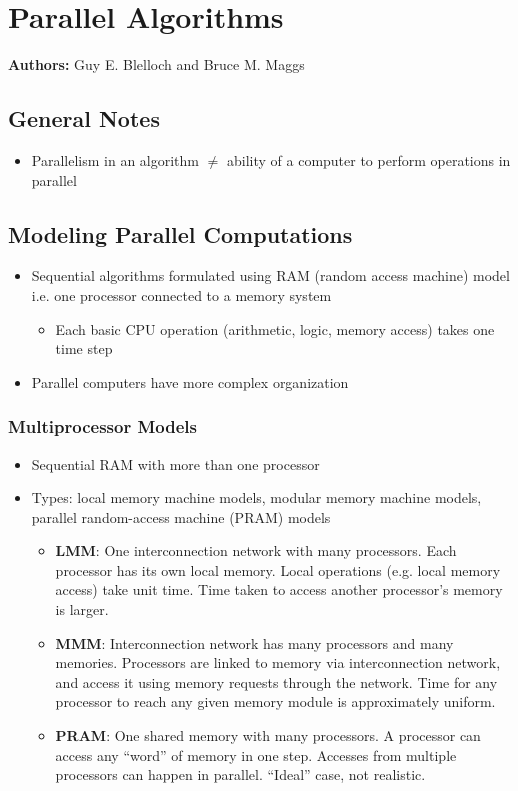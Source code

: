 \section{Parallel Algorithms}

\textbf{Authors:} Guy E. Blelloch and Bruce M. Maggs

\subsection{General Notes}

\begin{itemize}
    \item Parallelism in an algorithm $\neq$ ability of a computer to perform operations in parallel
\end{itemize}

\subsection{Modeling Parallel Computations}

\begin{itemize}
    \item Sequential algorithms formulated using RAM (random access machine) model i.e. one processor connected to a memory system
    \begin{itemize}
        \item Each basic CPU operation (arithmetic, logic, memory access) takes one time step
    \end{itemize}
    \item Parallel computers have more complex organization
\end{itemize}

\subsubsection{Multiprocessor Models}

\begin{itemize}
    \item Sequential RAM with more than one processor
    \item Types: local memory machine models, modular memory machine models, parallel random-access machine (PRAM) models
    \begin{itemize}
        \item \textbf{LMM}: One interconnection network with many processors. Each processor has its own local memory. Local operations (e.g. local memory access) take unit time. Time taken to access another processor's memory is larger.
        \item \textbf{MMM}: Interconnection network has many processors and many memories. Processors are linked to memory via interconnection network, and access it using memory requests through the network. Time for any processor to reach any given memory module is approximately uniform.
        \item \textbf{PRAM}: One shared memory with many processors. A processor can access any ``word'' of memory in one step. Accesses from multiple processors can happen in parallel. ``Ideal'' case, not realistic.
    \end{itemize}
\end{itemize}

